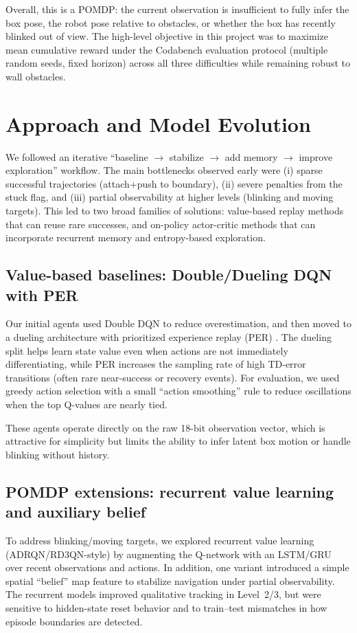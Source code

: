 \documentclass[11pt, oneside]{article}    %
\begin{document}
Overall, this is a POMDP: the current observation is insufficient to fully infer the box pose, the robot pose relative to obstacles, or whether the box has recently blinked out of view. The high-level objective in this project was to maximize mean cumulative reward under the Codabench evaluation protocol (multiple random seeds, fixed horizon) across all three difficulties while remaining robust to wall obstacles.

\section{Approach and Model Evolution}
We followed an iterative ``baseline $\rightarrow$ stabilize $\rightarrow$ add memory $\rightarrow$ improve exploration'' workflow. The main bottlenecks observed early were (i) sparse successful trajectories (attach+push to boundary), (ii) severe penalties from the stuck flag, and (iii) partial observability at higher levels (blinking and moving targets). This led to two broad families of solutions: value-based replay methods that can reuse rare successes, and on-policy actor-critic methods that can incorporate recurrent memory and entropy-based exploration.

\subsection{Value-based baselines: Double/Dueling DQN with PER}
Our initial agents used Double DQN \citep{vanhasselt2016double} to reduce overestimation, and then moved to a dueling architecture \citep{wang2016dueling} with prioritized experience replay (PER) \citep{schaul2016per}. The dueling split helps learn state value even when actions are not immediately differentiating, while PER increases the sampling rate of high TD-error transitions (often rare near-success or recovery events). For evaluation, we used greedy action selection with a small ``action smoothing'' rule to reduce oscillations when the top Q-values are nearly tied.

These agents operate directly on the raw 18-bit observation vector, which is attractive for simplicity but limits the ability to infer latent box motion or handle blinking without history.

\subsection{POMDP extensions: recurrent value learning and auxiliary belief}
To address blinking/moving targets, we explored recurrent value learning (ADRQN/RD3QN-style) by augmenting the Q-network with an LSTM/GRU over recent observations and actions. In addition, one variant introduced a simple spatial ``belief'' map feature to stabilize navigation under partial observability. The recurrent models improved qualitative tracking in Level~2/3, but were sensitive to hidden-state reset behavior and to train--test mismatches in how episode boundaries are detected.
\end{document}
